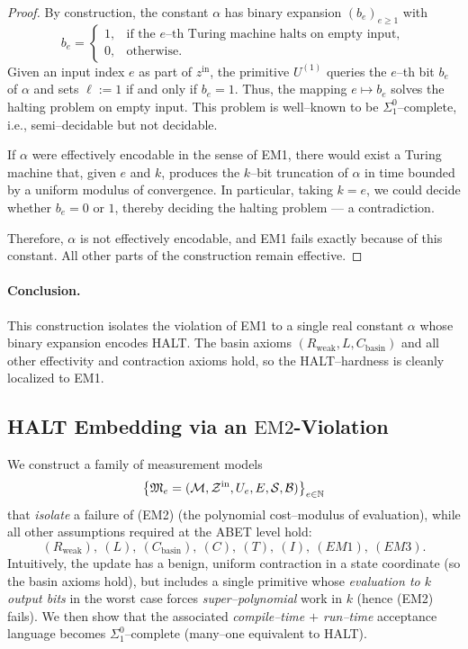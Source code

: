\documentclass[12pt]{article}
\theoremstyle{definition}
\theoremstyle{plain}
\begin{document}
\begin{proof}
By construction, the constant $\alpha$ has binary expansion $(b_e)_{e\ge1}$ with
\[
  b_e = 
  \begin{cases}
  1, & \text{if the $e$--th Turing machine halts on empty input},\\
  0, & \text{otherwise}.
  \end{cases}
\]
Given an input index $e$ as part of $z^{\mathrm{in}}$, the primitive $U^{(1)}$ queries the $e$–th bit $b_e$ of $\alpha$ and sets $\ell := 1$ if and only if $b_e=1$.
Thus, the mapping $e\mapsto b_e$ solves the halting problem on empty input. This problem is well–known to be $\Sigma^0_1$–complete, i.e., semi–decidable but not decidable.

If $\alpha$ were effectively encodable in the sense of EM1, there would exist a Turing machine that, given $e$ and $k$, produces the $k$–bit truncation of $\alpha$ in time bounded by a uniform modulus of convergence. In particular, taking $k=e$, we could decide whether $b_e=0$ or $1$, thereby deciding the halting problem — a contradiction.

Therefore, $\alpha$ is not effectively encodable, and EM1 fails exactly because of this constant. All other parts of the construction remain effective.
\end{proof}

\paragraph{Conclusion.}
This construction isolates the violation of EM1 to a single real constant $\alpha$ whose binary expansion encodes HALT. The basin axioms $(R_{\mathrm{weak}},L,C_{\mathrm{basin}})$ and all other effectivity and contraction axioms hold, so the HALT–hardness is cleanly localized to EM1.


\subsection{HALT Embedding via an \texorpdfstring{$\mathrm{EM2}$}{EM2}-Violation}
\label{sec:EM2-violation}

We construct a family of measurement models
\[
  \bigl\{\mathfrak M_e=(\mathcal M,\mathcal Z^{\rm in},U_e,E,\mathcal S,\mathcal B)\bigr\}_{e\in\mathbb N}
\]
that \emph{isolate} a failure of \textup{(EM2)} (the polynomial cost–modulus of evaluation), while all other assumptions required at the ABET level hold:
\[
  (R_{\text{weak}}),\ (L),\ (C_{\text{basin}}),\ (C),\ (T),\ (I),\ (EM1),\ (EM3).
\]
Intuitively, the update has a benign, uniform contraction in a state coordinate (so the basin axioms hold), but includes a single primitive whose \emph{evaluation to $k$ output bits} in the worst case forces \emph{super–polynomial} work in $k$ (hence \textup{(EM2)} fails). We then show that the associated \emph{compile–time $+$ run–time} acceptance language becomes $\Sigma^0_1$–complete (many–one equivalent to \textsc{HALT}).
\end{document}
